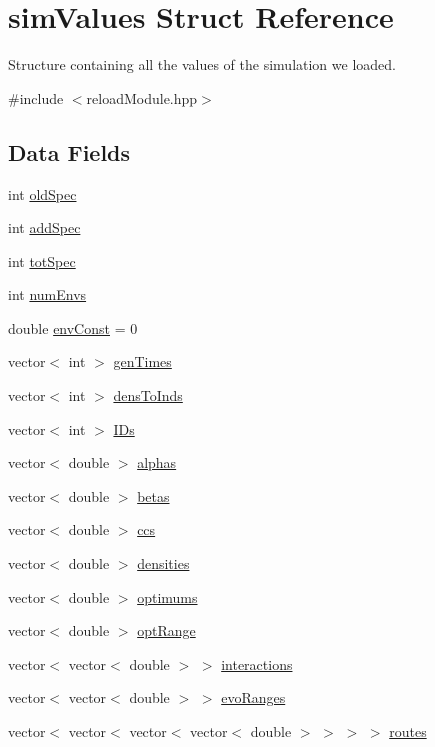 \hypertarget{structsimValues}{}\section{sim\+Values Struct Reference}
\label{structsimValues}


Structure containing all the values of the simulation we loaded.  




{\ttfamily \#include $<$reload\+Module.\+hpp$>$}

\subsection*{Data Fields}
\begin{DoxyCompactItemize}
\item 
int \hyperlink{structsimValues_a409841bd1a747a200c99c86bfd11a78a}{old\+Spec}
\item 
int \hyperlink{structsimValues_ac7fbf812eba3e2b88996d1366131bf8e}{add\+Spec}
\item 
int \hyperlink{structsimValues_aeb4d9fe040a0ecb69669675753088a10}{tot\+Spec}
\item 
int \hyperlink{structsimValues_ae28b0e24d2b560548b1f4ba0eea035ee}{num\+Envs}
\item 
double \hyperlink{structsimValues_a0b3bdcfb8a911b35e71ab03aad776453}{env\+Const} = 0
\item 
vector$<$ int $>$ \hyperlink{structsimValues_a0c396a3dc37a1ecf668cbf0d6f52305f}{gen\+Times}
\item 
vector$<$ int $>$ \hyperlink{structsimValues_a658893629c5a789c447057da417e5096}{dens\+To\+Inds}
\item 
vector$<$ int $>$ \hyperlink{structsimValues_afe2312ca2bca46eac7a108d1aa9c88f0}{I\+Ds}
\item 
vector$<$ double $>$ \hyperlink{structsimValues_aa7977c641471b71ca3f88d98e2b01831}{alphas}
\item 
vector$<$ double $>$ \hyperlink{structsimValues_ab7b209f99b228a55680d64fc964b0d34}{betas}
\item 
vector$<$ double $>$ \hyperlink{structsimValues_a08f1c4e0b6042043876d9d2d2699a922}{ccs}
\item 
vector$<$ double $>$ \hyperlink{structsimValues_a14ed3f6bacb44ceb58b7929e90fe0516}{densities}
\item 
vector$<$ double $>$ \hyperlink{structsimValues_ab00d0541616bb1d309639954b90b3e1d}{optimums}
\item 
vector$<$ double $>$ \hyperlink{structsimValues_a8b045e15d8493873f87bbfb99cc6c10d}{opt\+Range}
\item 
vector$<$ vector$<$ double $>$ $>$ \hyperlink{structsimValues_afacf91cde42df4983ac4640c6fe78470}{interactions}
\item 
vector$<$ vector$<$ double $>$ $>$ \hyperlink{structsimValues_a5c4fa1fbabac24649729c3692bd2a59f}{evo\+Ranges}
\item 
vector$<$ vector$<$ vector$<$ vector$<$ double $>$ $>$ $>$ $>$ \hyperlink{structsimValues_a6745659920f5fb456202f8c84cb75a46}{routes}
\end{DoxyCompactItemize}



